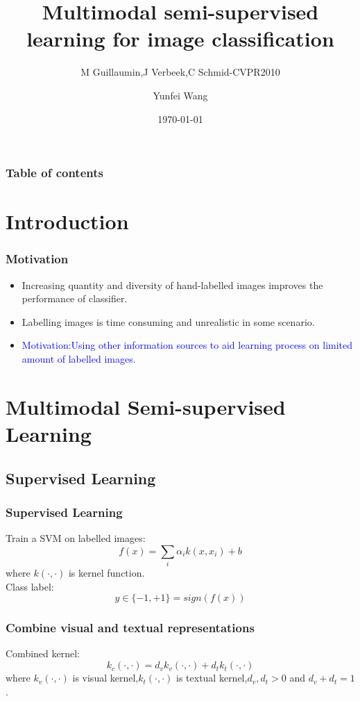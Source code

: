 \documentclass{beamer}
\title{Multimodal semi-supervised learning for image classification}
\subtitle{M Guillaumin,J Verbeek,C Schmid-CVPR2010}
\author{Yunfei Wang}
\institute{Department of Computer Science \& Technology \\ Huazhong University of Science \& Technology}
\date{\today}
\begin{document}
\begin{CJK*}{UTF8}{gbsn} %

\begin{frame}
\titlepage
\end{frame}


\begin{frame}\frametitle{Table of contents}
\tableofcontents
\end{frame}

\section{Introduction}
\begin{frame}\frametitle{Motivation}
\begin{itemize}
\item Increasing quantity and diversity of hand-labelled images improves the performance of classifier.
\item Labelling images is time consuming and unrealistic in some scenario.
\item \textcolor{blue}{Motivation:Using other information sources to aid learning process on limited amount of labelled images.}
\end{itemize}
\end{frame}

\section{Multimodal Semi-supervised Learning}
\subsection{Supervised Learning}
\begin{frame}[allowframebreaks]\frametitle{Supervised Learning}
Train a SVM on labelled images:
\begin{equation}
f(x)=\sum_i\alpha_ik(x,x_i)+b
\end{equation}
where $k(\cdot,\cdot)$ is kernel function.\\
Class label:
\[
y\in\{-1,+1\}=sign(f(x))
\]
\end{frame}

\begin{frame}\frametitle{Combine visual and textual representations}
Combined kernel:
\begin{equation}
k_c(\cdot,\cdot)=d_vk_v(\cdot,\cdot)+d_tk_t(\cdot,\cdot)
\end{equation}
where $k_v(\cdot,\cdot)$ is visual kernel,$k_t(\cdot,\cdot)$ is textual kernel,$d_v,d_t>0$ and $d_v+d_t=1$.\\


\end{frame}
\end{CJK*}
\end{document}

